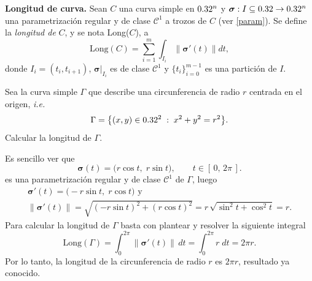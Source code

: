 \begin{definition}\label{long}\textbf{Longitud de curva.}
    Sean $C$ una curva simple en $0.32^n$ y  $\boldsymbol{\sigma}:I\subseteq0.32\to0.32^n$ una parametrizaci\'on regular y  de clase $\mathcal{C}^1$ a trozos de $C$  (ver\: \ref{param}). Se define la \emph{longitud de} $C$, y se nota  Long($C$), a 
    \[
        \text{Long}(C)=\sum_{i=1}^{m}\int_{I_i}\|\boldsymbol{\sigma}'(t)\|dt,    
    \]
   donde $ I_i= (t_i, t_{i+1})$,  $\boldsymbol{\sigma}\lvert_{I_i}$ es de clase $\mathcal{C}^1$  y  $\{t_i\}_{i=0}^{m-1}$  es una partici\'on de $I$.
\end{definition}



\begin{example}
    Sea la curva simple $\Gamma$ que describe una circunferencia de radio $r$ centrada en el origen, \emph{i.e.}
        \[
            \Gamma = \bigl\{(x,y)\in0.32^2 \;:\; x^2 + y^2 = r^2 \bigr\}.
        \]
         Calcular la longitud de $\Gamma$.
        
        
       Es sencillo ver que 
        \[
            \boldsymbol{\sigma}(t) 
            = 
            \bigl(r\cos t,\;r\sin t\bigr),
            \qquad t\in [\,0,\,2\pi\,].
        \] 
       es una parametrización regular y de clase  \(\mathcal{C}^1\)  de \(\Gamma\), luego  
        \begin{gather*}
            \boldsymbol{\sigma}'(t)
            =
            \bigl(-r\sin t,\;r\cos t\bigr) \mbox{ y }\\[.2cm]
            \|\boldsymbol{\sigma}'(t)\|
            =
            \sqrt{(-r\sin t)^2 + (r\cos t)^2}
            =
            r\,\sqrt{\sin^2 t + \cos^2 t}
            = 
            r.
        \end{gather*}
       Para calcular la longitud de $\Gamma$  basta con plantear y resolver la siguiente integral
        \[
            \mathrm{Long}(\Gamma)
            =
            \int_{0}^{2\pi} \bigl\|\boldsymbol{\sigma}'(t)\bigr\| \, dt
            =
            \int_{0}^{2\pi} r \; dt
            =
            2\pi r.
        \]
        Por lo tanto, la  longitud de la circunferencia de radio \(r\) es \(2\pi r\), resultado ya conocido. 
    \end{example}
    
